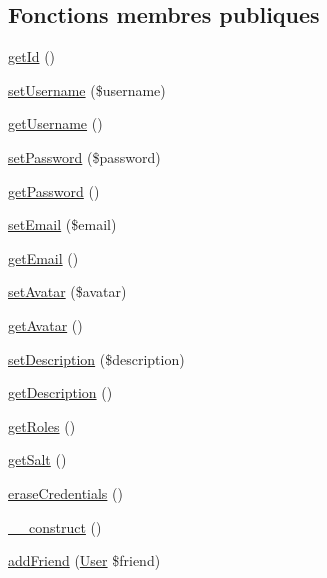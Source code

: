 \subsection*{Fonctions membres publiques}
\begin{DoxyCompactItemize}
\item 
\hyperlink{classAppBundle_1_1Entity_1_1User_aaa021257dad62d5358521ff7b99face1}{get\+Id} ()
\item 
\hyperlink{classAppBundle_1_1Entity_1_1User_a9f6b20493060944536b750b40b4471e3}{set\+Username} (\$username)
\item 
\hyperlink{classAppBundle_1_1Entity_1_1User_abfb46cc3484bde6475517e11fc39688e}{get\+Username} ()
\item 
\hyperlink{classAppBundle_1_1Entity_1_1User_aee5056e27aa8e27ca38af6e6373f99e8}{set\+Password} (\$password)
\item 
\hyperlink{classAppBundle_1_1Entity_1_1User_ad3e3f65ed144a768cad99df4d588cd63}{get\+Password} ()
\item 
\hyperlink{classAppBundle_1_1Entity_1_1User_a717949a66aa01fdba29d464294d60723}{set\+Email} (\$email)
\item 
\hyperlink{classAppBundle_1_1Entity_1_1User_a20d5e560b025fd5248ad680749f7c79c}{get\+Email} ()
\item 
\hyperlink{classAppBundle_1_1Entity_1_1User_acf0e0a3188e796f7a9bc40a66b1cca12}{set\+Avatar} (\$avatar)
\item 
\hyperlink{classAppBundle_1_1Entity_1_1User_a770921ad3fbe7019a53d0dd7a3ec1328}{get\+Avatar} ()
\item 
\hyperlink{classAppBundle_1_1Entity_1_1User_af69d6db9253e066027e55c07c209b392}{set\+Description} (\$description)
\item 
\hyperlink{classAppBundle_1_1Entity_1_1User_abdbd6231b898b07d0a159bd0f254770c}{get\+Description} ()
\item 
\hyperlink{classAppBundle_1_1Entity_1_1User_a7feac9233be86c6fd93280a891905a2b}{get\+Roles} ()
\item 
\hyperlink{classAppBundle_1_1Entity_1_1User_a5c4b12b13068e7e0ff2fe3e773ef16ee}{get\+Salt} ()
\item 
\hyperlink{classAppBundle_1_1Entity_1_1User_adc1ae82385690849964ace63e84a1321}{erase\+Credentials} ()
\item 
\hyperlink{classAppBundle_1_1Entity_1_1User_a3e00ef768aa0cac041abfda0d164bfcb}{\+\_\+\+\_\+construct} ()
\item 
\hyperlink{classAppBundle_1_1Entity_1_1User_ad089e5a875b330dcc623176a025df18a}{add\+Friend} (\hyperlink{classAppBundle_1_1Entity_1_1User}{User} \$friend)

\end{DoxyCompactItemize}
